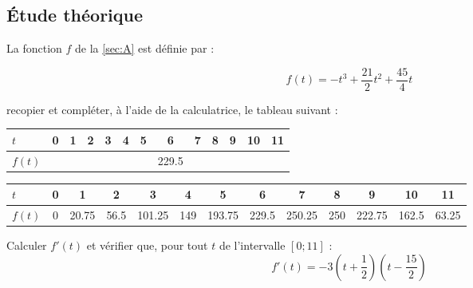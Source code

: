 \subsection{\'Etude théorique}

La fonction $f$ de la \ref{sec:A} est définie par :

	\begin{equation*}
		f(t) = -t^3 + \frac{21}{2} t^2 + \frac{45}{4}t
	\end{equation*}
	
\begin{questions}
	\question[2] recopier et compléter, à l'aide de la calculatrice, le tableau suivant :
	\begin{center}
		
	\begin{tabular}{|@{\ }l@{\ }|@{\ \ }c@{\ \ }|@{\ \ }c@{\ \ }|@{\ \ }c@{\ \ }|@{\ \ }c@{\ \ }|@{\ \ }c@{\ \ }|@{\ \ }c@{\ \ }|@{\ \ }c@{\ \ }|@{\ \ }c@{\ \ }|@{\ \ }c@{\ \ }|@{\ \ }c@{\ \ }|@{\ \ }c@{\ \ }|@{\ \ }c@{\ \ }|}
		\hline
		$t$    & 0 & 1 & 2 & 3 & 4 & 5 & 6           & 7 & 8 & 9 & 10 & 11 \\ \hline
		$f(t)$ &   &   &   &   &   &   & \num{229.5} &   &   &   &    &    \\ \hline
	\end{tabular}
	\end{center}

	\begin{solution}
		\begin{center}
			
			\begin{tabular}{|@{\ }l@{\ }|@{\ }c@{\ }|@{\ }c@{\ }|@{\ }c@{\ }|@{\ }c@{\ }|@{\ }c@{\ }|@{\ }c@{\ }|@{\ }c@{\ }|@{\ }c@{\ }|@{\ }c@{\ }|@{\ }c@{\ }|@{\ }c@{\ }|@{\ }c@{\ }|}
				\hline
				$t$    & 0 & 1 & 2 & 3 & 4 & 5 & 6           & 7 & 8 & 9 & 10 & 11 \\ \hline
				$f(t)$ & 0  & \num{20.75}  & \num{56.5}  & \num{101.25}  & \num{149}  & \num{193.75}  & \num{229.5} & \num{250.25}  & \num{250}  & \num{222.75}  &  \num{162.5}  &  \num{63.25}  \\ \hline
			\end{tabular}
		\end{center}
	\end{solution}

	\question[2] Calculer $f'(t)$ et vérifier que, pour tout $t$ de l'intervalle $\left[0; 11\right]$ :
		\begin{equation*}
			f'(t) = -3 \left(t + \frac{1}{2} \right) \left(t - \frac{15}{2} \right)
		\end{equation*}
		

\end{questions}
